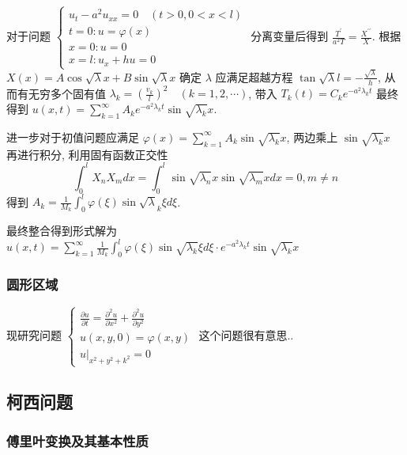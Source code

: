 \documentclass[10pt]{yerbaformat}
\begin{document}
\par 对于问题 $\label{chubian} \left\{\begin{array}{l}u_{t}-a^{2} u_{x x}=0 \quad(t>0,0<x<l) \\ t=0: u=\varphi(x) \\ x=0: u=0 \\ x=l: u_{x}+h u=0\end{array}\right.$ 分离变量后得到 $\frac{T^{\prime}}{a^{2} T}=\frac{X^{\prime \prime}}{X}$. 根据 $X(x)=A \cos \sqrt{\lambda} x+B \sin \sqrt{\lambda} x$ 确定 $\lambda$ 应满足超越方程 $\tan \sqrt{\lambda} l=-\frac{\sqrt{\lambda}}{h}$, 从而有无穷多个固有值 $\lambda_{k}=\left(\frac{v_{k}}{l}\right)^{2} \quad(k=1,2, \cdots)$, 带入 $T_{k}(t)=C_{k} e^{-a^{2} \lambda_{k} t}$ 最终得到 $u(x, t)=\sum_{k=1}^{\infty} A_{k} e^{-a^{2} \lambda_{k} t} \sin \sqrt{\lambda_{k}} x$.

\par 进一步对于初值问题应满足 $\varphi(x)=\sum_{k=1}^{\infty} A_{k} \sin \sqrt{\lambda_{k}} x$, 两边乘上 $\sin \sqrt{\lambda_{k}} x$ 再进行积分, 利用固有函数正交性 $$\int_{0}^{l} X_{n} X_{m} d x=\int_{0}^{l} \sin \sqrt{\lambda_{n}} x \sin \sqrt{\lambda_{m}} x d x=0, m \neq n$$ 得到 $A_{k}=\frac{1}{M_{k}} \int_{0}^{l} \varphi(\xi) \sin \sqrt{\lambda}_{k} \xi d \xi$.

\par 最终整合得到形式解为 $u(x, t)=\sum_{k=1}^{\infty} \frac{1}{M_{k}} \int_{0}^{l} \varphi(\xi) \sin \sqrt{\lambda_{k}} \xi d \xi \cdot e^{-a^{2} \lambda_{k} t} \sin \sqrt{\lambda_{k}} x$

\subsubsection*{圆形区域}
\par 现研究问题 $\left\{\begin{array}{l}\frac{\partial u}{\partial t}=\frac{\partial^{2} u}{\partial x^{2}}+\frac{\partial^{2} u}{\partial y^{2}} \\ u(x, y, 0)=\varphi(x, y) \\ \left.u\right|_{x^{2}+y^{2}+k^{2}}=0\end{array}\right.$ 这个问题很有意思..

\subsection{柯西问题}
\subsubsection{傅里叶变换及其基本性质}
\end{document}
